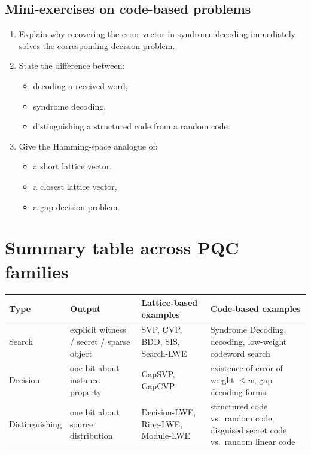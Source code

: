 \documentclass[11pt]{article}
\begin{document}
	\subsection{Mini-exercises on code-based problems}
	
	\begin{enumerate}
		\item Explain why recovering the error vector in syndrome decoding immediately solves the corresponding decision problem.
		\item State the difference between:
		\begin{itemize}
			\item decoding a received word,
			\item syndrome decoding,
			\item distinguishing a structured code from a random code.
		\end{itemize}
		\item Give the Hamming-space analogue of:
		\begin{itemize}
			\item a short lattice vector,
			\item a closest lattice vector,
			\item a gap decision problem.
		\end{itemize}
	\end{enumerate}

	\newpage
	\section{Summary table across PQC families}
	
	\begin{center}
		\renewcommand{\arraystretch}{1.35}
		\begin{tabular}{>{\raggedright\arraybackslash}p{2.3cm} >{\raggedright\arraybackslash}p{3.8cm} >{\raggedright\arraybackslash}p{4.6cm} >{\raggedright\arraybackslash}p{4.2cm}}
			\toprule
			\textbf{Type} & \textbf{Output} & \textbf{Lattice-based examples} & \textbf{Code-based examples} \\
			\midrule
			Search & explicit witness / secret / sparse object & SVP, CVP, BDD, SIS, Search-LWE & Syndrome Decoding, decoding, low-weight codeword search \\
			\midrule
			Decision & one bit about instance property & GapSVP, GapCVP & existence of error of weight $\le w$, gap decoding forms \\
			\midrule
			Distinguishing & one bit about source distribution & Decision-LWE, Ring-LWE, Module-LWE & structured code vs.\ random code, disguised secret code vs.\ random linear code \\
			\bottomrule
		\end{tabular}
	\end{center}
\end{document}
